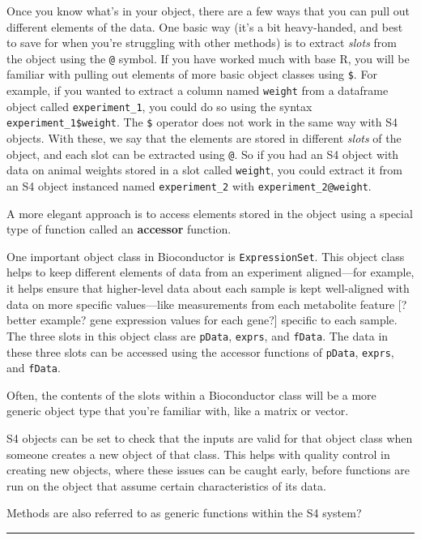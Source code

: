 \documentclass[]{tufte-book}
\begin{document}
Once you know what's in your object, there are a few ways that you can pull
out different elements of the data. One basic way (it's a bit heavy-handed,
and best to save for when you're struggling with other methods) is to
extract \emph{slots} from the object using the \texttt{@} symbol. If you have worked much
with base R, you will be familiar with pulling out elements of more basic object
classes using \texttt{\$}. For example, if you wanted to extract a column named \texttt{weight}
from a dataframe object called \texttt{experiment\_1}, you could do so using
the syntax \texttt{experiment\_1\$weight}. The \texttt{\$} operator does not work in the same
way with S4 objects. With these, we say that the elements are stored in different
\emph{slots} of the object, and each slot can be extracted using \texttt{@}. So if you had
an S4 object with data on animal weights stored in a slot called \texttt{weight}, you
could extract it from an S4 object instanced named \texttt{experiment\_2} with
\texttt{experiment\_2@weight}.

A more elegant approach is to access elements stored in the object using a
special type of function called an \textbf{accessor} function.

One important object class in Bioconductor is \texttt{ExpressionSet}. This object class
helps to keep different elements of data from an experiment aligned---for
example, it helps ensure that higher-level data about each sample is kept
well-aligned with data on more specific values---like measurements from each
metabolite feature {[}? better example? gene expression values for each gene?{]}
specific to each sample. The three slots in this object class are \texttt{pData},
\texttt{exprs}, and \texttt{fData}. The data in these three slots can be accessed using the
accessor functions of \texttt{pData}, \texttt{exprs}, and \texttt{fData}.

Often, the contents of the slots within a Bioconductor class will be a more
generic object type that you're familiar with, like a matrix or vector.

S4 objects can be set to check that the inputs are valid for that object
class when someone creates a new object of that class. This helps with
quality control in creating new objects, where these issues can be caught
early, before functions are run on the object that assume certain characteristics
of its data.

Methods are also referred to as generic functions within the S4 system?

\begin{center}\rule{0.5\linewidth}{0.5pt}\end{center}
\end{document}
